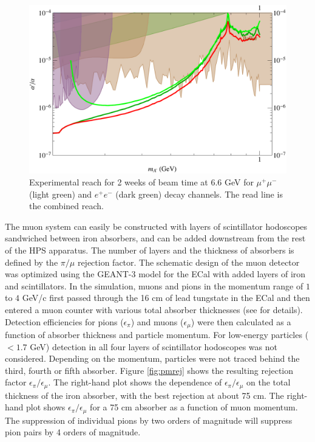 \begin{figure}[!ht]
\includegraphics[scale=0.7]{muon/HPS_reach_muon.pdf}
\caption{\small{Experimental reach for 2 weeks of beam time at 6.6 GeV for $\mu^+\mu^-$ (light green) and $e^+e^-$ (dark green) decay channels. The read line is the combined reach.}}\label{fig:mureach}
\end{figure}


The muon system can easily be constructed with layers of scintillator hodoscopes sandwiched between iron absorbers, and can be added downstream from the rest of the HPS apparatus.
The number of layers and the thickness of absorbers is defined by the $\pi/\mu$ rejection factor. The schematic design of the muon detector was optimized using the GEANT-3 model for the ECal with added layers of iron and scintillators.  In the simulation, muons and pions in the momentum range of $1$ to $4$ GeV/c first passed through the 16 cm of lead tungstate in the ECal and then entered a muon counter with various total absorber thicknesses (see \cite{HPS_PROP} for details).  Detection efficiencies for pions ($\epsilon_\pi$) and muons ($\epsilon_\mu$) were then calculated as a function of absorber thickness and particle momentum.  For low-energy particles ($< 1.7$ GeV) detection in all four layers of scintillator hodoscopes was not considered. Depending on the momentum, particles were not traced behind the third, fourth or fifth absorber.  
Figure \ref{fig:pmrej} shows the resulting rejection factor $\epsilon_\pi/\epsilon_\mu$.  The right-hand plot shows the dependence of  $\epsilon_\pi/\epsilon_\mu$ on the total thickness of the iron absorber, with the best rejection at about 75 cm.  The right-hand plot shows $\epsilon_\pi/\epsilon_\mu$ for a 75 cm absorber as a function of muon momentum.  The suppression of individual pions by two orders of magnitude will suppress pion pairs by 4 orders of magnitude.  

